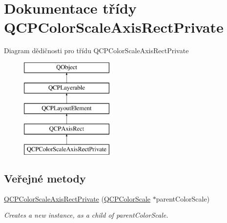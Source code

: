 \hypertarget{classQCPColorScaleAxisRectPrivate}{}\section{Dokumentace třídy Q\+C\+P\+Color\+Scale\+Axis\+Rect\+Private}
\label{classQCPColorScaleAxisRectPrivate}
Diagram dědičnosti pro třídu Q\+C\+P\+Color\+Scale\+Axis\+Rect\+Private\begin{figure}[H]
\begin{center}
\leavevmode
\includegraphics[height=5.000000cm]{classQCPColorScaleAxisRectPrivate}
\end{center}
\end{figure}
\subsection*{Veřejné metody}
\begin{DoxyCompactItemize}
\item 
\hypertarget{classQCPColorScaleAxisRectPrivate_ad3b242f75dd2b33581364a4e668a80db}{}\hyperlink{classQCPColorScaleAxisRectPrivate_ad3b242f75dd2b33581364a4e668a80db}{Q\+C\+P\+Color\+Scale\+Axis\+Rect\+Private} (\hyperlink{classQCPColorScale}{Q\+C\+P\+Color\+Scale} $\ast$parent\+Color\+Scale)\label{classQCPColorScaleAxisRectPrivate_ad3b242f75dd2b33581364a4e668a80db}

\begin{DoxyCompactList}\small\item\em Creates a new instance, as a child of {\itshape parent\+Color\+Scale}. \end{DoxyCompactList}\end{DoxyCompactItemize}
